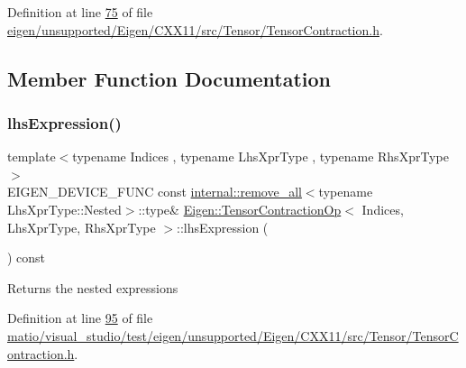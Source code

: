 Definition at line \hyperlink{eigen_2unsupported_2_eigen_2_c_x_x11_2src_2_tensor_2_tensor_contraction_8h_source_l00075}{75} of file \hyperlink{eigen_2unsupported_2_eigen_2_c_x_x11_2src_2_tensor_2_tensor_contraction_8h_source}{eigen/unsupported/\+Eigen/\+C\+X\+X11/src/\+Tensor/\+Tensor\+Contraction.\+h}.



\subsection{Member Function Documentation}
\mbox{\label{class_eigen_1_1_tensor_contraction_op_a1e3bb92babac5554f7164b12e9654daa}} 
\subsubsection{\texorpdfstring{lhs\+Expression()}{lhsExpression()}\hspace{0.1cm}{\footnotesize\ttfamily [1/2]}}
{\footnotesize\ttfamily template$<$typename Indices , typename Lhs\+Xpr\+Type , typename Rhs\+Xpr\+Type $>$ \\
E\+I\+G\+E\+N\+\_\+\+D\+E\+V\+I\+C\+E\+\_\+\+F\+U\+NC const \hyperlink{struct_eigen_1_1internal_1_1remove__all}{internal\+::remove\+\_\+all}$<$typename Lhs\+Xpr\+Type\+::\+Nested$>$\+::type\& \hyperlink{class_eigen_1_1_tensor_contraction_op}{Eigen\+::\+Tensor\+Contraction\+Op}$<$ Indices, Lhs\+Xpr\+Type, Rhs\+Xpr\+Type $>$\+::lhs\+Expression (\begin{DoxyParamCaption}{ }\end{DoxyParamCaption}) const\hspace{0.3cm}{\ttfamily [inline]}}

\begin{DoxyReturn}{Returns}
the nested expressions 
\end{DoxyReturn}


Definition at line \hyperlink{matio_2visual__studio_2test_2eigen_2unsupported_2_eigen_2_c_x_x11_2src_2_tensor_2_tensor_contraction_8h_source_l00095}{95} of file \hyperlink{matio_2visual__studio_2test_2eigen_2unsupported_2_eigen_2_c_x_x11_2src_2_tensor_2_tensor_contraction_8h_source}{matio/visual\+\_\+studio/test/eigen/unsupported/\+Eigen/\+C\+X\+X11/src/\+Tensor/\+Tensor\+Contraction.\+h}.

